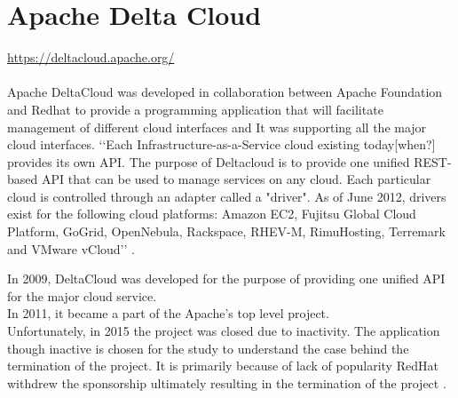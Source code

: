 \section{Apache Delta Cloud}
\url{ https://deltacloud.apache.org/ } \\
\\
Apache DeltaCloud was developed in collaboration between Apache Foundation and Redhat
to provide a programming application that will 
facilitate management of different cloud interfaces and
It was supporting all the major cloud interfaces. 
‘‘Each Infrastructure-as-a-Service cloud existing today[when?] provides
its own API. The purpose of Deltacloud is to provide one unified 
REST-based API that can be used to manage services on any cloud. Each particular 
cloud is controlled through an adapter called a "driver". As of June 2012, drivers 
exist for the following cloud platforms: Amazon EC2, Fujitsu Global Cloud Platform, 
GoGrid, OpenNebula, Rackspace, RHEV-M, RimuHosting, Terremark and VMware vCloud’’ 
\cite{hid-sp18-417-wiki-deltacloud}.

In 2009, DeltaCloud was developed for the purpose of providing one unified 
API for the major cloud service. \\
In 2011, it became a part of the Apache’s top level project. \\ Unfortunately,
in 2015 the project was closed due to inactivity. 
The application though inactive is chosen for the study to understand 
the case behind the termination of the project. 
It is primarily because of lack of popularity RedHat withdrew the 
sponsorship ultimately resulting in the 
termination of the project .
